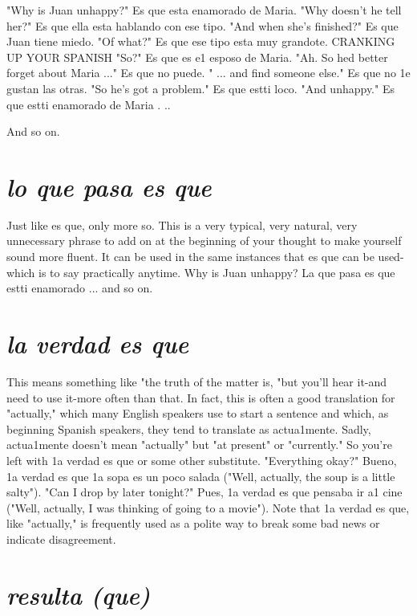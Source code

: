 \bsk

"Why is Juan unhappy?"
Es que esta enamorado de Maria.
"Why doesn't he tell her?"
Es que ella esta hablando con ese tipo.
"And when she's finished?"
Es que Juan tiene miedo.
"Of what?"
Es que ese tipo esta muy grandote.
CRANKING UP YOUR SPANISH
"So?"
Es que es e1 esposo de Maria.
"Ah. So hed better forget about Maria ..."
Es que no puede.
" ... and find someone else."
Es que no 1e gustan las otras.
"So he's got a problem."
Es que estti loco.
"And unhappy."
Es que estti enamorado de Maria . ..

\bsk

And so on.

\section{\emph{lo que pasa es que}}

Just like es que, only more so. This is a very typical, very
natural, very unnecessary phrase to add on at the beginning of your
thought to make yourself sound more fluent. It can be used in the
same instances that es que can be used-which is to say practically
anytime. Why is Juan unhappy? La que pasa es que estti
enamorado ... and so on.

\section{\emph{la verdad es que}}

This means something like "the truth of the matter is, "but
you'll hear it-and need to use it-more often than that. In fact, this is
often a good translation for "actually," which many English speakers
use to start a sentence and which, as beginning Spanish speakers, they
tend to translate as actua1mente. Sadly, actua1mente doesn't mean
"actually" but "at present" or "currently." So you're left with 1a verdad es que or some other substitute. "Everything okay?" Bueno, 1a
verdad es que 1a sopa es un poco salada ("Well, actually, the soup is a
little salty"). "Can I drop by later tonight?" Pues, 1a verdad es que pensaba ir a1 cine ("Well, actually, I was thinking of going to a movie").
Note that 1a verdad es que, like "actually," is frequently used as a polite way to break some bad news or indicate disagreement.

\section{\emph{resulta (que)}}

